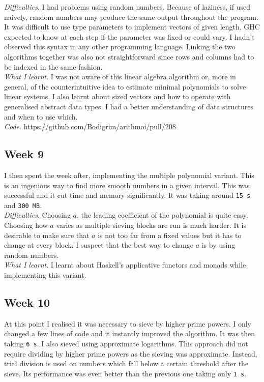 \documentclass{amsart}
\theoremstyle{definition}
\theoremstyle{remark}
\numberwithin{equation}{section}
\begin{document}
\emph{Difficulties}. I had problems using random numbers. Because of laziness, if used naively, random numbers may produce the same output throughout the program. It was difficult to use type parameters to implement vectors of given length. GHC expected to know at each step if the parameter was fixed or could vary. I hadn't observed this syntax in any other programming language. Linking the two algorithms together was also not straightforward since rows and columns had to be indexed in the same fashion. \\

\emph{What I learnt}. I was not aware of this linear algebra algorithm or, more in general, of the counterintuitive idea to estimate minimal polynomials to solve linear systems. I also learnt about sized vectors and how to operate with generalised abstract data types. I had a better understanding of data structures and when to use which.\\

\emph{Code}. \url{https://github.com/Bodigrim/arithmoi/pull/208}

\subsection*{Week 9}
I then spent the week after, implementing the multiple polynomial variant. This is an ingenious way to find more smooth numbers in a given interval. This was successful and it cut time and memory significantly. It was taking around \texttt{15 s} and \texttt{300 MB}. \\

\emph{Difficulties}. Choosing $a$, the leading coefficient of the polynomial is quite easy. Choosing how $a$ varies as multiple sieving blocks are run is much harder. It is desirable to make sure that $a$ is not too far from a fixed values but it has to change at every block. I suspect that the best way to change $a$ is by using random numbers. \\

\emph{What I learnt}. I learnt about Haskell's applicative functors and monads while implementing this variant.

\subsection*{Week 10}
At this point I realised it was necessary to sieve by higher prime powers. I only changed a few lines of code and it instantly improved the algorithm. It was then taking \texttt{6 s}. I also sieved using approximate logarithms. This approach did not require dividing by higher prime powers as the sieving was approximate. Instead, trial division is used on numbers which fall below a certain threshold after the sieve. Its performance was even better than the previous one taking only \texttt{1 s}. \\
\end{document}
